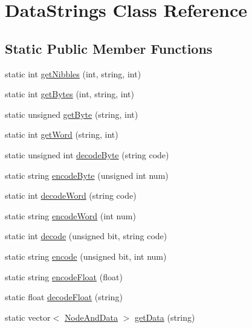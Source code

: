 \hypertarget{classDataStrings}{
\section{DataStrings Class Reference}
\label{classDataStrings}
}
\subsection*{Static Public Member Functions}
\begin{DoxyCompactItemize}
\item 
static int \hyperlink{classDataStrings_aa2df0794f9ec86503a238a457b963b96}{getNibbles} (int, string, int)
\item 
static int \hyperlink{classDataStrings_a966c13fc690343dbe1022efaa0d64361}{getBytes} (int, string, int)
\item 
static unsigned \hyperlink{classDataStrings_a7e07a327b93e74d5b320ef0485db7a89}{getByte} (string, int)
\item 
static int \hyperlink{classDataStrings_abb6df04a95c423a6b3f8e9bc5c64c40a}{getWord} (string, int)
\item 
static unsigned int \hyperlink{classDataStrings_ad4368edf61246ac52e03aeb7fb2bbd39}{decodeByte} (string code)
\item 
static string \hyperlink{classDataStrings_a49277265d8e3452b66a32b6ee3df84f1}{encodeByte} (unsigned int num)
\item 
static int \hyperlink{classDataStrings_aab412b1f14f0aa184be075cc7f3e1292}{decodeWord} (string code)
\item 
static string \hyperlink{classDataStrings_a6f006e5be30be2bed7964aed0586d38f}{encodeWord} (int num)
\item 
static int \hyperlink{classDataStrings_ad9781143a12f82cf677940d35d32d2cc}{decode} (unsigned bit, string code)
\item 
static string \hyperlink{classDataStrings_a2fcc2c42051507e518252c91980c3475}{encode} (unsigned bit, int num)
\item 
static string \hyperlink{classDataStrings_a416919ab32b17ec1ded450e5e80fb05f}{encodeFloat} (float)
\item 
static float \hyperlink{classDataStrings_a4572cc7a60f7c91e4262a7b07b378fa1}{decodeFloat} (string)
\item 
static vector$<$ \hyperlink{structNodeAndData}{NodeAndData} $>$ \hyperlink{classDataStrings_ad9df1b24bed654e0b7da9e354e5a4e43}{getData} (string)
\item 

\end{DoxyCompactItemize}

